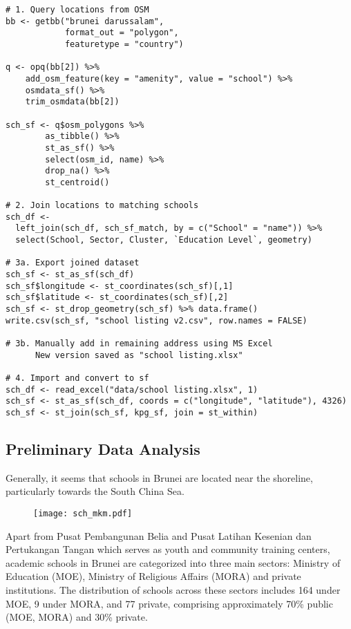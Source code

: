 \documentclass[12pt]{article}
\begin{document}
\begin{tcolorbox}[title=Corresponding Codes]
\begin{verbatim}
# 1. Query locations from OSM
bb <- getbb("brunei darussalam", 
            format_out = "polygon", 
            featuretype = "country")

q <- opq(bb[2]) %>% 
    add_osm_feature(key = "amenity", value = "school") %>% 
    osmdata_sf() %>% 
    trim_osmdata(bb[2])

sch_sf <- q$osm_polygons %>% 
        as_tibble() %>% 
        st_as_sf() %>%  
        select(osm_id, name) %>% 
        drop_na() %>% 
        st_centroid()

# 2. Join locations to matching schools
sch_df <- 
  left_join(sch_df, sch_sf_match, by = c("School" = "name")) %>% 
  select(School, Sector, Cluster, `Education Level`, geometry)

# 3a. Export joined dataset
sch_sf <- st_as_sf(sch_df)
sch_sf$longitude <- st_coordinates(sch_sf)[,1]
sch_sf$latitude <- st_coordinates(sch_sf)[,2]
sch_sf <- st_drop_geometry(sch_sf) %>% data.frame()
write.csv(sch_sf, "school listing v2.csv", row.names = FALSE)

# 3b. Manually add in remaining address using MS Excel
      New version saved as "school listing.xlsx"

# 4. Import and convert to sf 
sch_df <- read_excel("data/school listing.xlsx", 1)
sch_sf <- st_as_sf(sch_df, coords = c("longitude", "latitude"), 4326)
sch_sf <- st_join(sch_sf, kpg_sf, join = st_within)
\end{verbatim}
\end{tcolorbox}

\subsection{Preliminary Data Analysis}
\label{subsec: prelim data analysis}
Generally, it seems that schools in Brunei are located near the shoreline, particularly towards the South China Sea. 

\begin{figure}[htbp]
\centering
\texttt{[image: sch\_mkm.pdf]}
\end{figure} 

Apart from Pusat Pembangunan Belia and Pusat Latihan Kesenian dan Pertukangan Tangan which serves as youth and community training centers, academic schools in Brunei are categorized into three main sectors: Ministry of Education (MOE), Ministry of Religious Affairs (MORA) and private institutions. The distribution of schools across these sectors includes 164 under MOE, 9 under MORA, and 77 private, comprising approximately 70\% public (MOE, MORA) and 30\% private. 
\end{document}

